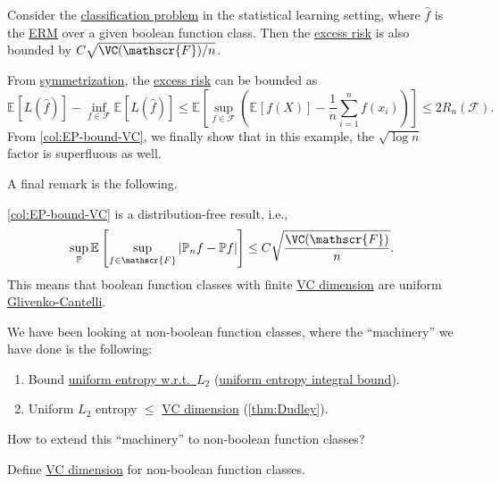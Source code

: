 \begin{note}
	Consider the \hyperref[eg:1D-classification-thresholds]{classification problem} in the statistical learning setting, where \(\hat{f} \) is the \hyperref[prb:ERM]{ERM} over a given boolean function class. Then the \hyperref[def:excess-risk]{excess risk} is also bounded by \(C \sqrt{\VC(\mathscr{F} ) / n} \).
\end{note}
\begin{explanation}
	From \hyperref[lma:symmetrization]{symmetrization}, the \hyperref[def:excess-risk]{excess risk} can be bounded as
	\[
		\mathbb{E}_{}\left[L(\hat{f} ) \right] - \inf _{f\in \mathscr{F} } \mathbb{E}_{}\left[L(\hat{f} ) \right]
		\leq \mathbb{E}_{}\left[\sup _{f\in \mathscr{F} } \left( \mathbb{E}_{}\left[f(X) \right] - \frac{1}{n}\sum_{i=1}^{n} f(x_i) \right) \right]
		\leq 2R_n(\mathscr{F} ).
	\]
	From \autoref{col:EP-bound-VC}, we finally show that in this example, the \(\sqrt{\log n} \) factor is superfluous as well.
\end{explanation}

A final remark is the following.

\begin{remark}
	\autoref{col:EP-bound-VC} is a distribution-free result, i.e.,
	\[
		\sup _{\mathbb{P} } \mathbb{E}_{}\left[\sup _{f\in \mathscr{F}} \vert \mathbb{P} _n f - \mathbb{P} f \vert  \right] \leq C \sqrt{\frac{\VC(\mathscr{F} )}{n}} .
	\]
	This means that boolean function classes with finite \hyperref[def:VC-dimension]{VC dimension} are uniform \hyperref[def:Glivenko-Cantelli]{Glivenko-Cantelli}.
\end{remark}

We have been looking at non-boolean function classes, where the ``machinery'' we have done is the following:
\begin{enumerate}
	\item Bound \hyperref[def:Koltchinskii-Pollard-entropy]{uniform entropy w.r.t.\ \(L_2\)} (\hyperref[thm:uniform-entropy-integral-bound]{uniform entropy integral bound}).
	\item Uniform \(L_2\) entropy \(\leq \) \hyperref[def:VC-dimension]{VC dimension} (\autoref{thm:Dudley}).
\end{enumerate}

\begin{problem*}
	How to extend this ``machinery'' to non-boolean function classes?
\end{problem*}
\begin{answer}
	Define \hyperref[def:VC-dimension]{VC dimension} for non-boolean function classes.
\end{answer}
